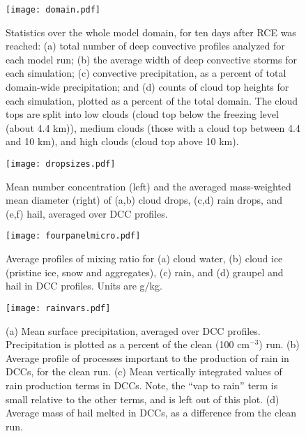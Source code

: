 \begin{figure}[t]
  \noindent\texttt{[image: domain.pdf]}\\
  \caption{Statistics over the whole model domain, for ten days after RCE was reached:  (a) total number of deep convective profiles analyzed for each model run; (b) the average width of deep convective storms for each simulation; (c) convective precipitation, as a percent of total domain-wide precipitation; and (d) counts of cloud top heights for each simulation, plotted as a percent of the total domain.  The cloud tops are split into low clouds (cloud top below the freezing level (about 4.4 km)), medium clouds (those with a cloud top between 4.4 and 10 km), and high clouds (cloud top above 10 km).}\label{domain}
\end{figure}



\begin{figure}[t]
  \noindent\texttt{[image: dropsizes.pdf]}\\
  \caption{Mean number concentration (left) and the averaged mass-weighted mean diameter (right) of (a,b) cloud drops, (c,d) rain drops, and (e,f) hail, averaged over DCC profiles.}\label{dropsizes}
\end{figure}

\begin{figure}[t]
  \noindent\texttt{[image: fourpanelmicro.pdf]}\\
  \caption{Average profiles of mixing ratio for (a) cloud water, (b) cloud ice (pristine ice, snow and aggregates), (c) rain, and (d) graupel and hail in DCC profiles.  Units are g/kg.}\label{fourpanelmicro}
\end{figure}


\begin{figure}[t]
  \noindent\texttt{[image: rainvars.pdf]}\\
  \caption{(a) Mean surface precipitation, averaged over DCC profiles.  Precipitation is plotted as a percent of the clean (100 cm$^{-3}$) run. (b) Average profile of processes important to the production of rain in DCCs, for the clean run. (c) Mean vertically integrated values of rain production terms in DCCs. Note, the ``vap to rain'' term is small relative to the other terms, and is left out of this plot.  (d) Average mass of hail melted in DCCs, as a difference from the clean run.} \label{rainvars}
\end{figure}

